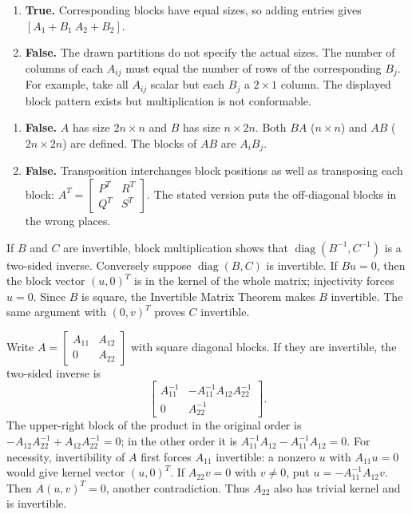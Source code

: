 \begin{enumerate}[label=(\alph*)]
\item \textbf{True.} Corresponding blocks have equal sizes, so adding
entries gives $[A_1+B_1\ A_2+B_2]$.
\item \textbf{False.} The drawn partitions do not specify the actual
sizes. The number of columns of each $A_{ij}$ must equal the number
of rows of the corresponding $B_j$. For example, take all $A_{ij}$
scalar but each $B_j$ a $2\times1$ column. The displayed block
pattern exists but multiplication is not conformable.
\end{enumerate}

\begin{enumerate}[label=(\alph*)]
\item \textbf{False.} $A$ has size $2n\times n$ and $B$ has size
$n\times2n$. Both $BA$ ($n\times n$) and $AB$ ($2n\times2n$)
are defined. The blocks of $AB$ are $A_iB_j$.
\item \textbf{False.} Transposition interchanges block positions as
well as transposing each block:
$A^T=\begin{bmatrix}P^T&R^T\\Q^T&S^T\end{bmatrix}$.
The stated version puts the off-diagonal blocks in the wrong places.
\end{enumerate}

If $B$ and $C$ are invertible, block multiplication shows that
$\operatorname{diag}(B^{-1},C^{-1})$ is a two-sided inverse.
Conversely suppose $\operatorname{diag}(B,C)$ is invertible.
If $Bu=0$, then the block vector $(u,0)^T$ is in the kernel of the
whole matrix; injectivity forces $u=0$. Since $B$ is square, the
Invertible Matrix Theorem makes $B$ invertible. The same argument
with $(0,v)^T$ proves $C$ invertible.

Write $A=\begin{bmatrix}A_{11}&A_{12}\\0&A_{22}\end{bmatrix}$ with
square diagonal blocks. If they are invertible, the two-sided inverse is
\[\begin{bmatrix}A_{11}^{-1}&-A_{11}^{-1}A_{12}A_{22}^{-1}\\
0&A_{22}^{-1}\end{bmatrix}.\]
The upper-right block of the product in the original order is
$-A_{12}A_{22}^{-1}+A_{12}A_{22}^{-1}=0$; in the other order
it is $A_{11}^{-1}A_{12}-A_{11}^{-1}A_{12}=0$.
For necessity, invertibility of $A$ first forces $A_{11}$ invertible:
a nonzero $u$ with $A_{11}u=0$ would give kernel vector $(u,0)^T$.
If $A_{22}v=0$ with $v\ne0$, put
$u=-A_{11}^{-1}A_{12}v$. Then $A(u,v)^T=0$, another contradiction.
Thus $A_{22}$ also has trivial kernel and is invertible.

